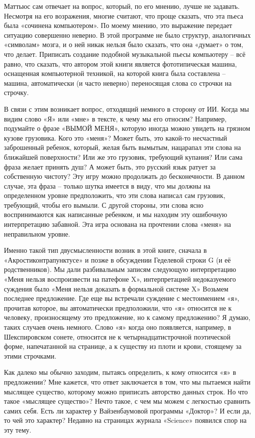 \documentclass[../main.tex]{subfiles}
\begin{document}
Маттьюс сам отвечает на вопрос, который, по его мнению, лучше не задавать. Несмотря на его возражения, многие считают, что проще сказать, что эта пьеса была «сочинена компьютером». По моему мнению, это выражение передает ситуацию совершенно неверно. В этой программе не было структур, аналогичных «символам» мозга, и о ней никак нельзя было сказать, что она «думает» о том, что делает. Приписать создание подобной музыкальной пьесы компьютеру \--- всё равно, что сказать, что автором этой книги является фототипическая машина, оснащенная компьютерной техникой, на которой книга была составлена \--- машина, автоматически (и часто неверно) переносящая слова со строчки на строчку.

В связи с этим возникает вопрос, отходящий немного в сторону от ИИ\@. Когда мы видим слово «Я» или «мне» в тексте, к чему мы его относим? Например, подумайте о фразе «ВЫМОЙ МЕНЯ», которую иногда можно увидеть на грязном кузове грузовика. Кого это «меня»? Может быть, это какой-то несчастный заброшенный ребенок, который, желая быть вымытым, нацарапал эти слова на ближайшей поверхности? Или же это грузовик, требующий купания? Или сама фраза желает принять душ? А может быть, это русский язык ратует за собственную чистоту? Эту игру можно продолжать до бесконечности. В данном случае, эта фраза \--- только шутка имеется в виду, что мы должны на определенном уровне предположить, что эти слова написал сам грузовик, требующий, чтобы его вымыли. С другой стороны, эти слова ясно воспринимаются как написанные ребенком, и мы находим эту ошибочную интерпретацию забавной. Эта игра основана на прочтении слова «меня» на неправильном уровне.

Именно такой тип двусмысленности возник в этой книге, сначала в «Акростиконтрапунктусе» и позже в обсуждении Геделевой строки G (и её родственников). Мы дали разбивальным записям следующую интерпретацию «Меня нельзя воспроизвести на патефоне X», интерпретацией недоказуемого суждения было «Меня нельзя доказать в формальной системе X» Возьмем последнее предложение. Где еще вы встречали суждение с местоимением «я», прочитав которое, вы автоматически предположили, что «я» относится не к человеку, произносящему это предложение, но к самому предложению? Я думаю, таких случаев очень немного. Слово «я» когда оно появляется, например, в Шекспировском сонете, относится не к четырнадцатистрочной поэтической форме, напечатанной на странице, а к существу из плоти и крови, стоящему за этими строчками.

Как далеко мы обычно заходим, пытаясь определить, к кому относится «я» в предложении? Мне кажется, что ответ заключается в том, что мы пытаемся найти мыслящее существо, которому можно приписать авторство данных строк. Но что такое «мыслящее существо»? Нечто такое, с чем мы можем с легкостью сравнить самих себя. Есть ли характер у Вайзенбаумовой программы «Доктор»? И если да, то чей это характер? Недавно на страницах журнала «Science» появился спор на эту тему.
\end{document}
